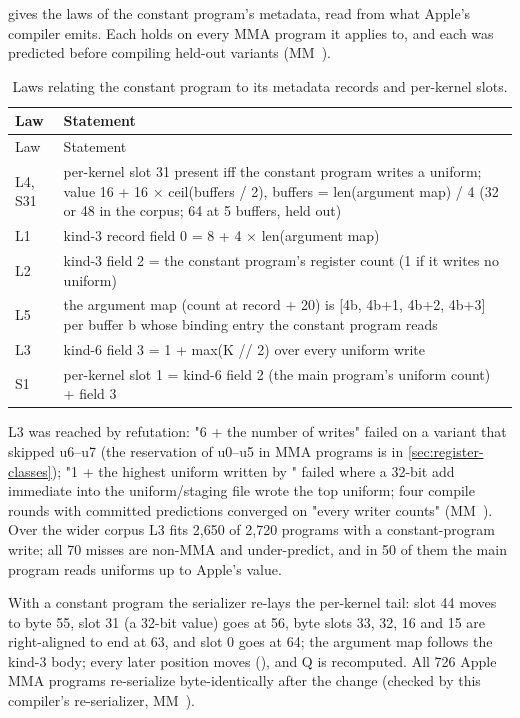  gives the laws of the constant program's metadata, read from what Apple's compiler emits.
Each holds on every MMA program it applies to, and each was predicted before compiling held-out variants (MM~).

\begin{xltabular}{\linewidth}{@{}lX@{}}
\caption{Laws relating the constant program to its metadata records and per-kernel slots.}\label{tab:constant-program-laws}\\
\toprule
Law & Statement \\
\midrule
\endfirsthead
{}
\toprule
Law & Statement \\
\midrule
\endhead
L4, S31 & per-kernel slot 31 present iff the constant program writes a uniform;
value 16 + 16 $\times$ ceil(buffers / 2), buffers = len(argument map) / 4 (32
or 48 in the corpus; 64 at 5 buffers, held out) \\*
L1 & kind-3 record field 0 = 8 + 4 $\times$ len(argument map) \\*
L2 & kind-3 field 2 = the constant program's register count
(1 if it writes no uniform) \\*
L5 & the argument map (count at record + 20) is {[}4b, 4b+1, 4b+2, 4b+3{]}
per buffer b whose binding entry the constant program reads \\*
L3 & kind-6 field 3 = 1 + max(K // 2) over every uniform write \\*
S1 & per-kernel slot 1 = kind-6 field 2 (the main program's
uniform count) + field 3 \\*
\bottomrule
\end{xltabular}

L3 was reached by refutation: "6 + the number of writes" failed on a variant that skipped u6--u7 (the reservation of u0--u5 in MMA programs is in
\cref{sec:register-classes}); "1 + the highest
uniform written by " failed where a 32-bit add immediate into the uniform/staging file
wrote the top uniform; four compile rounds with committed predictions converged on "every writer counts" (MM~). Over the wider corpus L3 fits 2,650 of 2,720 programs with a constant-program write;
all 70 misses are non-MMA and under-predict, and in 50 of them the main program reads uniforms up to Apple's value.

With a constant program the serializer re-lays the per-kernel tail: slot 44 moves to byte 55, slot 31 (a 32-bit
value) goes at 56, byte slots 33, 32, 16 and 15 are right-aligned to end at 63, and slot 0 goes at 64; the argument map
follows the kind-3 body; every later position moves (), and Q is recomputed. All 726 Apple MMA programs
re-serialize byte-identically after the change (checked by this compiler's re-serializer, MM~).

